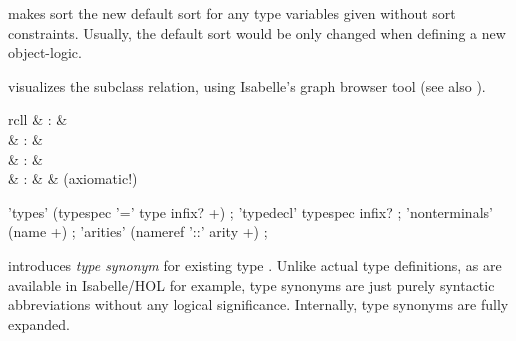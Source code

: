 \begin{isabellebody}
\begin{isamarkuptext}
\begin{descr}
  \item [\hyperlink{command.defaultsort}{\mbox{\isa{\isacommand{defaultsort}}}}~\isa{s}] makes sort  the
  new default sort for any type variables given without sort
  constraints.  Usually, the default sort would be only changed when
  defining a new object-logic.

  \item [\hyperlink{command.class-deps}{\mbox{\isa{\isacommand{class{\isacharunderscore}deps}}}}] visualizes the subclass relation,
  using Isabelle's graph browser tool (see also \cite{isabelle-sys}).

  \end{descr}%
\end{isamarkuptext}%
\isamarkuptrue%
%
\isamarkuptrue%
%
\begin{isamarkuptext}%
\begin{matharray}{rcll}
    \hypertarget{command.types}{\hyperlink{command.types}{\mbox{}}} & : &  \\
    \hypertarget{command.typedecl}{\hyperlink{command.typedecl}{\mbox{}}} & : &  \\
    \hypertarget{command.nonterminals}{\hyperlink{command.nonterminals}{\mbox{}}} & : &  \\
    \hypertarget{command.arities}{\hyperlink{command.arities}{\mbox{}}} & : &  & (axiomatic!) \\
  \end{matharray}

  \begin{rail}
    'types' (typespec '=' type infix? +)
    ;
    'typedecl' typespec infix?
    ;
    'nonterminals' (name +)
    ;
    'arities' (nameref '::' arity +)
    ;
  \end{rail}

  \begin{descr}

  \item [\hyperlink{command.types}{\mbox{\isa{\isacommand{types}}}}~\isa{{\isachardoublequote}{\isacharparenleft}{\isasymalpha}\isactrlsub {\isadigit{1}}{\isacharcomma}\ {\isasymdots}{\isacharcomma}\ {\isasymalpha}\isactrlsub n{\isacharparenright}\ t\ {\isacharequal}\ {\isasymtau}{\isachardoublequote}}]
  introduces \emph{type synonym} 
  for existing type \isa{{\isachardoublequote}{\isasymtau}{\isachardoublequote}}.  Unlike actual type definitions, as
  are available in Isabelle/HOL for example, type synonyms are just
  purely syntactic abbreviations without any logical significance.
  Internally, type synonyms are fully expanded.
  

\end{descr}
\end{isamarkuptext}
\end{isabellebody}
